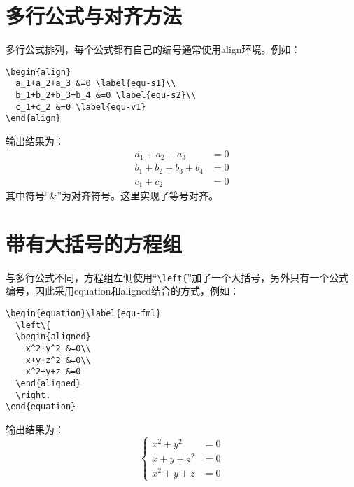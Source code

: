 \section{多行公式与对齐方法}
多行公式排列，每个公式都有自己的编号通常使用align环境。例如：
\begin{verbatim}
\begin{align}
  a_1+a_2+a_3 &=0 \label{equ-s1}\\
  b_1+b_2+b_3+b_4 &=0 \label{equ-s2}\\
  c_1+c_2 &=0 \label{equ-v1}
\end{align}
\end{verbatim}
输出结果为：
\begin{align}
  a_1+a_2+a_3 &=0 \label{equ-s1}\\
  b_1+b_2+b_3+b_4 &=0 \label{equ-s2}\\
  c_1+c_2 &=0 \label{equ-v1}
\end{align}
其中符号“\&”为对齐符号。这里实现了等号对齐。

\section{带有大括号的方程组}
与多行公式不同，方程组左侧使用“\verb|\left{|”加了一个大括号，另外只有一个公式编号，因此采用equation和aligned结合的方式，例如：
\begin{verbatim}
\begin{equation}\label{equ-fml}
  \left\{
  \begin{aligned}
    x^2+y^2 &=0\\
    x+y+z^2 &=0\\
    x^2+y+z &=0
  \end{aligned}
  \right.
\end{equation}
\end{verbatim}
输出结果为：
\begin{equation}\label{equ-fml}
  \left\{
  \begin{aligned}
    x^2+y^2 &=0\\
    x+y+z^2 &=0\\
    x^2+y+z &=0
  \end{aligned}
  \right.
\end{equation}

